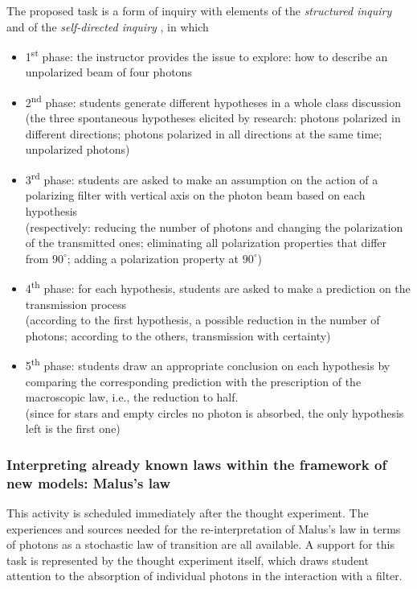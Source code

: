 \documentclass[twocolumn,secnumarabic,amssymb, nobibnotes, aps, prd, nofootinbib]{revtex4-2}
\begin{document}
The proposed task is a form of inquiry with elements of the \emph{structured inquiry} and of the \emph{self-directed inquiry} \cite{Llewellyn2012}, in which
\begin{itemize}
    \item 1\textsuperscript{st} phase: the instructor provides the issue to explore: how to describe an unpolarized beam of four photons
    \item 2\textsuperscript{nd} phase: students generate different hypotheses in a whole class discussion\ \\
        (the three spontaneous hypotheses elicited by research: photons polarized in different directions; photons polarized in all directions at the same time; unpolarized photons)
    \item 3\textsuperscript{rd} phase: students are asked to make an assumption on the action of a polarizing filter with vertical axis on the photon beam based on each hypothesis\ \\
        (respectively: reducing the number of photons and changing the polarization of the transmitted ones; eliminating all polarization properties that differ from $90^{\circ}$; adding a polarization property at $90^{\circ}$)
    \item 4\textsuperscript{th} phase: for each hypothesis, students are asked to make a prediction on the transmission process\ \\ (according to the first hypothesis, a possible reduction in the number of photons; according to the others, transmission with certainty)
    \item 5\textsuperscript{th} phase: students draw an appropriate conclusion on each hypothesis by comparing the corresponding prediction with the prescription of the macroscopic law, i.e., the reduction to half.\ \\
        (since for stars and empty circles no photon is absorbed, the only hypothesis left is the first one)
\end{itemize}


\subsubsection{Interpreting already known laws within the framework of new models: Malus's law} \label{Sec:3.4.2}

This activity is scheduled immediately after the thought experiment. The experiences and sources needed for the re-interpretation of Malus's law in terms of photons as a stochastic law of transition are all available. A support for this task is represented by the thought experiment itself, which draws student attention to the absorption of individual photons in the interaction with a filter.
\end{document}
